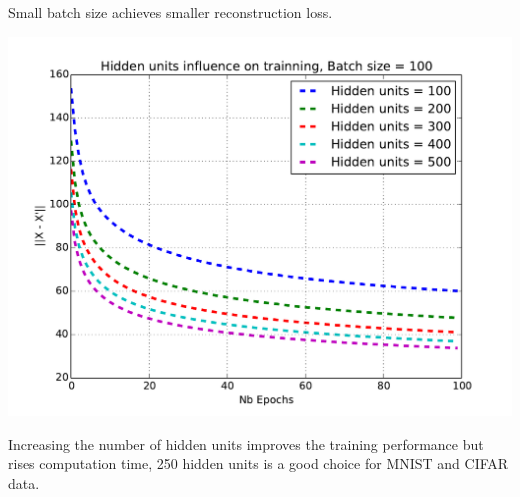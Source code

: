 \documentclass[landscape,a1paper,fontscale=0.5]{baposter} %
\begin{document}
\begin{poster}
{\begin{multicols}{2}
Small batch size achieves smaller reconstruction loss. 


\begin{center}
	\centering
	\includegraphics[width=\linewidth,height=0.65\linewidth]{hidden_units}
\end{center}
Increasing the number of hidden units improves the training performance but rises computation time, 250 hidden units is a good choice for MNIST and CIFAR data. 

\end{multicols}

}





\end{poster}
\end{document}

